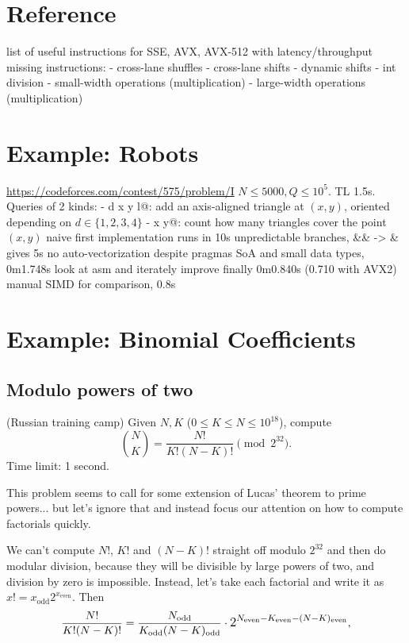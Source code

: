 \documentclass[openany]{book}
\begin{document}
\chapter{Reference}
list of useful instructions for SSE, AVX, AVX-512 with latency/throughput
missing instructions:
- cross-lane shuffles
- cross-lane shifts
- dynamic shifts
- int division
- small-width operations (multiplication)
- large-width operations (multiplication)

\chapter{Example: Robots}
\url{https://codeforces.com/contest/575/problem/I}
$N \le 5000, Q \le 10^5$. TL 1.5s. Queries of 2 kinds:
-  d x y l@: add an axis-aligned triangle at $(x,y)$, oriented depending on $d \in \{1,2,3,4\}$
-  x y@: count how many triangles cover the point $(x, y)$
naive first implementation runs in 10s
unpredictable branches, \&\& -> \& gives 5s
no auto-vectorization despite pragmas
SoA and small data types, 0m1.748s
look at asm and iterately improve
finally 0m0.840s (0.710 with AVX2)
manual SIMD for comparison, 0.8s

\chapter{Example: Binomial Coefficients}
\section{Modulo powers of two}
\begin{framed}
\noindent
(Russian training camp) Given $N, K$ ($0 \le K \le N \le 10^{18}$), compute
\[
\binom N K = \frac{N!}{K!(N-K)!} \pmod {2^{32}}.
\]
Time limit: 1 second.
\end{framed}
This problem seems to call for some extension of Lucas' theorem to prime powers... but let's ignore that and instead focus our attention on how to compute factorials quickly.

\newcommand{\odd}[1]{#1_\text{odd}}
\newcommand{\even}[1]{#1_\text{even}}

We can't compute $N!$, $K!$ and $(N-K)!$ straight off modulo $2^{32}$ and then do modular division, because they will be divisible by large powers of two, and division by zero is impossible. Instead, let's take each factorial and write it as $x! = \odd{x}2^{\even{x}}$. Then
\[
\frac{N!}{K!(N-K)!} =
\frac{\odd N}{\odd K \odd{(N-K)}} \cdot \mathlarger{2^{\even N - \even K - \even{(N-K)}}},
\]
\end{document}
